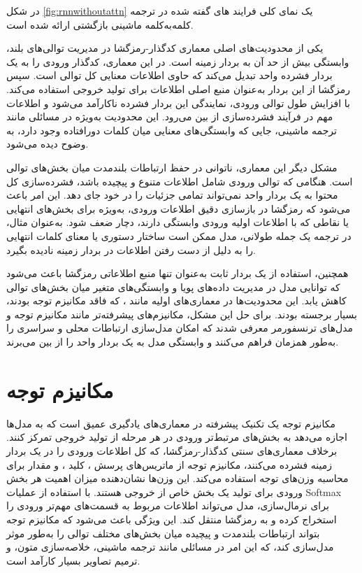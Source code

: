 در شکل \ref{fig:rnnwithoutattn} یک نمای کلی فرایند های گفته شده در ترجمه کلمه‌به‌کلمه ماشینی بازگشتی ارائه شده است.

یکی از محدودیت‌های اصلی معماری کدگذار-رمزگشا  در مدیریت توالی‌های بلند، وابستگی بیش از حد آن به بردار زمینه  است. در این معماری، کدگذار ورودی را به یک بردار فشرده واحد تبدیل می‌کند که حاوی اطلاعات معنایی کل توالی است. سپس رمزگشا از این بردار به‌عنوان منبع اصلی اطلاعات برای تولید خروجی استفاده می‌کند. با افزایش طول توالی ورودی، نمایندگی این بردار فشرده ناکارآمد می‌شود و اطلاعات مهم در فرآیند فشرده‌سازی از بین می‌رود. این محدودیت به‌ویژه در مسائلی مانند ترجمه ماشینی، جایی که وابستگی‌های معنایی میان کلمات دورافتاده وجود دارد، به وضوح دیده می‌شود.

مشکل دیگر این معماری، ناتوانی در حفظ ارتباطات بلندمدت میان بخش‌های توالی است. هنگامی که توالی ورودی شامل اطلاعات متنوع و پیچیده باشد، فشرده‌سازی کل محتوا به یک بردار واحد نمی‌تواند تمامی جزئیات را در خود جای دهد. این امر باعث می‌شود که رمزگشا در بازسازی دقیق اطلاعات ورودی، به‌ویژه برای بخش‌های انتهایی یا نقاطی که با اطلاعات اولیه ورودی وابستگی دارند، دچار ضعف شود. به‌عنوان مثال، در ترجمه یک جمله طولانی، مدل ممکن است ساختار دستوری یا معنای کلمات انتهایی را به دلیل از دست رفتن اطلاعات در بردار زمینه نادیده بگیرد.

همچنین، استفاده از یک بردار ثابت به‌عنوان تنها منبع اطلاعاتی رمزگشا باعث می‌شود که توانایی مدل در مدیریت داده‌های پویا و وابستگی‌های متغیر میان بخش‌های توالی کاهش یابد. این محدودیت‌ها در معماری‌های اولیه مانند ، که فاقد مکانیزم توجه بودند، بسیار برجسته بودند. برای حل این مشکل، مکانیزم‌های پیشرفته‌تر مانند مکانیزم توجه و مدل‌های ترنسفورمر معرفی شدند که امکان مدل‌سازی ارتباطات محلی و سراسری را به‌طور همزمان فراهم می‌کنند و وابستگی مدل به یک بردار واحد را از بین می‌برند.

\section{مکانیزم توجه}
مکانیزم توجه%
\cite{bahdanauNeuralMachineTranslation2016} یک تکنیک پیشرفته در معماری‌های یادگیری عمیق است که به مدل‌ها اجازه می‌دهد به بخش‌های مرتبط‌تر ورودی در هر مرحله از تولید خروجی تمرکز کنند. برخلاف معماری‌های سنتی کدگذار-رمزگشا، که کل اطلاعات ورودی را در یک بردار زمینه فشرده می‌کنند، مکانیزم توجه از ماتریس‌های پرسش 
،
 کلید 
 ،
  و مقدار   برای محاسبه وزن‌های توجه استفاده می‌کند. این وزن‌ها نشان‌دهنده میزان اهمیت هر بخش ورودی برای تولید یک بخش خاص از خروجی هستند. با استفاده از عملیات Softmax برای نرمال‌سازی، مدل می‌تواند اطلاعات مربوط به قسمت‌های مهم‌تر ورودی را استخراج کرده و به رمزگشا منتقل کند. این ویژگی باعث می‌شود که مکانیزم توجه بتواند ارتباطات بلندمدت و پیچیده میان بخش‌های مختلف توالی را به‌طور موثر مدل‌سازی کند، که این امر در مسائلی مانند ترجمه ماشینی، خلاصه‌سازی متون، و ترمیم تصاویر بسیار کارآمد است.
  
